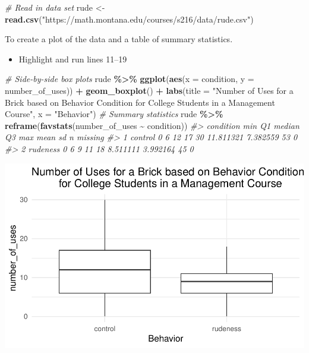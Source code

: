 \documentclass[
]{report}
\newenvironment{Shaded}{\begin{snugshade}}{\end{snugshade}}
\newcommand{\AttributeTok}[1]{\textcolor[rgb]{0.13,0.29,0.53}{#1}}
\newcommand{\CommentTok}[1]{\textcolor[rgb]{0.56,0.35,0.01}{\textit{#1}}}
\newcommand{\FunctionTok}[1]{\textcolor[rgb]{0.13,0.29,0.53}{\textbf{#1}}}
\newcommand{\NormalTok}[1]{#1}
\newcommand{\OtherTok}[1]{\textcolor[rgb]{0.56,0.35,0.01}{#1}}
\newcommand{\SpecialCharTok}[1]{\textcolor[rgb]{0.81,0.36,0.00}{\textbf{#1}}}
\newcommand{\StringTok}[1]{\textcolor[rgb]{0.31,0.60,0.02}{#1}}
\providecommand{\tightlist}{%
  \setlength{\itemsep}{0pt}\setlength{\parskip}{0pt}}
\begin{document}
\begin{Shaded}
\begin{Highlighting}[]
\CommentTok{\# Read in data set}
\NormalTok{rude }\OtherTok{\textless{}{-}} \FunctionTok{read.csv}\NormalTok{(}\StringTok{"https://math.montana.edu/courses/s216/data/rude.csv"}\NormalTok{)}
\end{Highlighting}
\end{Shaded}

\newpage

To create a plot of the data and a table of summary statistics.

\begin{itemize}
\tightlist
\item
  Highlight and run lines 11--19
\end{itemize}

\begin{Shaded}
\begin{Highlighting}[]
\CommentTok{\# Side{-}by{-}side box plots}
\NormalTok{rude }\SpecialCharTok{\%\textgreater{}\%}
\FunctionTok{ggplot}\NormalTok{(}\FunctionTok{aes}\NormalTok{(}\AttributeTok{x =}\NormalTok{ condition, }\AttributeTok{y =}\NormalTok{ number\_of\_uses)) }\SpecialCharTok{+}
    \FunctionTok{geom\_boxplot}\NormalTok{() }\SpecialCharTok{+} 
    \FunctionTok{labs}\NormalTok{(}\AttributeTok{title =} \StringTok{"Number of Uses for a Brick based on Behavior Condition}
\StringTok{         for College Students in a Management Course"}\NormalTok{,}
         \AttributeTok{x =} \StringTok{"Behavior"}\NormalTok{) }
\CommentTok{\# Summary statistics}
\NormalTok{rude }\SpecialCharTok{\%\textgreater{}\%} 
     \FunctionTok{reframe}\NormalTok{(}\FunctionTok{favstats}\NormalTok{(number\_of\_uses }\SpecialCharTok{\textasciitilde{}}\NormalTok{ condition))}
\CommentTok{\#\textgreater{}   condition min Q1 median Q3 max      mean       sd  n missing}
\CommentTok{\#\textgreater{} 1   control   0  6     12 17  30 11.811321 7.382559 53       0}
\CommentTok{\#\textgreater{} 2  rudeness   0  6      9 11  18  8.511111 3.992164 45       0}
\end{Highlighting}
\end{Shaded}

\begin{center}\includegraphics[width=0.6\linewidth]{12-A24-inference-1ofeach-simulation_files/figure-latex/unnamed-chunk-2-1} \end{center}
\end{document}
